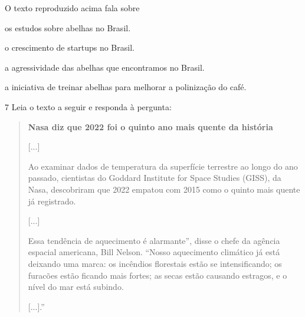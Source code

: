O texto reproduzido acima fala sobre

\begin{escolha}
\item os estudos sobre abelhas no Brasil.

\item o crescimento de startups no Brasil.

\item a agressividade das abelhas que encontramos no Brasil.

\item a iniciativa de treinar abelhas para melhorar a polinização do café.
\end{escolha}


\num{7} Leia o texto a seguir e responda à pergunta:

\begin{quote}
\textbf{Nasa diz que 2022 foi o quinto ano mais quente da história}

{[}...{]}

Ao examinar dados de temperatura da superfície terrestre ao longo do ano
passado, cientistas do Goddard Institute for Space Studies (GISS), da
Nasa, descobriram que 2022 empatou com 2015 como o quinto mais quente já
registrado.

{[}...{]}

Essa tendência de aquecimento é alarmante'', disse o chefe da agência
espacial americana, Bill Nelson. ``Nosso aquecimento climático já está
deixando uma marca: os incêndios florestais estão se intensificando; os
furacões estão ficando mais fortes; as secas estão causando estragos, e
o nível do mar está subindo.

{[}...{]}.''

\end{quote}

